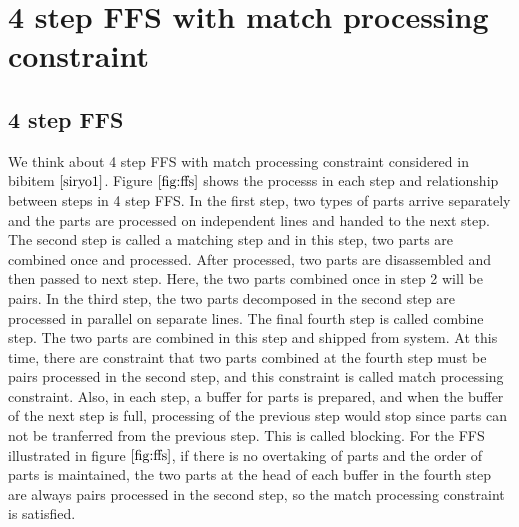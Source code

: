 %
%
%
%
%
%
%
%

\chapter{4 step FFS with match processing constraint} \label{sec:chapter2}


\section{4 step FFS \label{sec:zhangffs}}
We think about 4 step FFS with match processing constraint considered in bibitem $\cite{siryo1}$.
Figure $\ref{fig:ffs}$ shows the processs in each step and relationship between steps in 4 step FFS.
In the first step,  two types of parts arrive separately and the parts are processed on independent lines and handed to the next step.
The second step is called a matching step and in this step, two parts are combined once and processed. After processed, two parts are disassembled and then passed to next step.
Here, the two parts combined once in step 2 will be pairs.
In the third step, the two parts decomposed in the second step are processed in parallel on separate lines.
The final fourth step is called combine step. The two parts are combined in this step and shipped from system.
At this time, there are constraint that two parts combined at the fourth step must be pairs processed in the second step, and this constraint is called match processing constraint.
Also, in each step, a buffer for parts is prepared, and when the buffer of the next step is full, processing of the previous step would stop since parts can not be tranferred from the previous step.
This is called blocking.
For the FFS illustrated in figure $\ref{fig:ffs}$, if there is no overtaking of parts and the order of parts is maintained, the two parts at the head of each buffer in the fourth step are always pairs processed in the second step, so the match processing constraint is satisfied.

